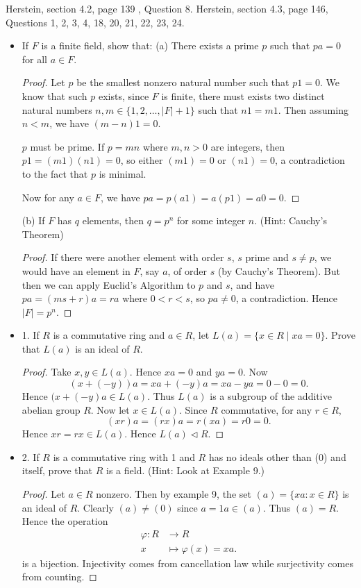 Herstein, section 4.2, page 139 , Question 8.
Herstein, section 4.3, page 146, Questions 1, 2, 3, 4, 18, 20, 21, 22, 23, 24.

\begin{itemize}
	\item [8.] If $F$ is a finite field, show that:
(a) There exists a prime $p$ such that $p a=0$ for all $a \in F$.
\begin{proof}
	Let $p$ be the smallest nonzero natural number such that $p 1 = 0$. We know that such $p$ exists, since $F$ is finite, there must exists two distinct natural numbers $n, m \in \{1, 2, \ldots, |F| + 1\} $ such that $n 1 = m 1$. Then assuming $n <  m$, we have  $(m-n) 1 = 0$.

	$p$ must be prime. If $p = mn$ where $m, n > 0$ are integers, then $p 1 = (m 1) ( n 1) = 0$, so either $(m 1) = 0$ or $(n 1) = 0$, a contradiction to the fact that  $p$ is minimal.

	Now for any $a \in F$, we have $p a = p (a 1) = a (p 1) = a 0 = 0$.
\end{proof}

(b) If $F$ has $q$ elements, then $q=p^n$ for some integer $n$. (Hint: Cauchy's Theorem)
\begin{proof}
	If there were another element with order $s$, $s$ prime and $s \neq p$, we would have an element in $F$, say $a$, of order $s$ (by Cauchy's Theorem). But then we can apply Euclid's Algorithm to $p$ and $s$, and have $p a = (m s + r) a = r a$ where $0<r<s$, so $p a \neq 0$, a contradiction. Hence  $|F| = p^n$.
\end{proof}

\item 1. If $R$ is a commutative ring and $a \in R$, let $L(a)=\{x \in R \mid x a=0\}$. Prove that $L(a)$ is an ideal of $R$.
\begin{proof}
	Take $x, y \in L(a)$. Hence $x a  = 0$ and $y a = 0$. Now
	\[
		(x + (-y))a = x a + (-y) a = xa - ya = 0 - 0 = 0
	.\] 
	Hence $(x + (-y)a \in L(a)$. Thus  $L(a)$ is a subgroup of the additive abelian group $R$. Now let $x \in L(a)$. Since $R$ commutative, for any $r \in R$,
	\[
		(xr) a = (rx)a = r(xa) = r 0 = 0
	.\] 
	Hence $xr = rx \in L(a)$. Hence $L(a) \triangleleft R$.
\end{proof}

\item 2. If $R$ is a commutative ring with 1 and $R$ has no ideals other than (0) and itself, prove that $R$ is a field. (Hint: Look at Example 9.)
\begin{proof}
	Let $a \in R$ nonzero. Then by example 9, the set $(a) = \{xa : x \in R\} $ is an ideal of $R$. Clearly $(a) \neq  (0)$ since $a = 1 a \in (a)$. Thus $(a) = R$. Hence the operation
	\begin{align*}
		\varphi: R &\longrightarrow R \\
		x &\longmapsto \varphi(x) = xa
	.\end{align*}
	is a bijection. Injectivity comes from cancellation law while surjectivity comes from counting.


\end{proof}
\end{itemize}

